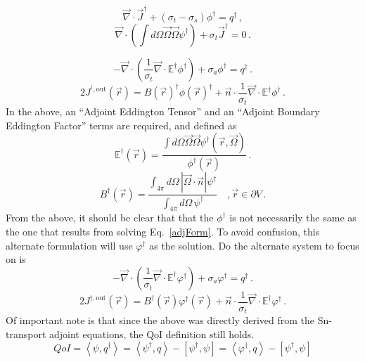 \documentclass[12pt]{report}
\newcommand{\vr}{\vec{r}}
\newcommand{\vO}{\vec{\Omega}}
\newcommand{\bra}{\left\langle}
\newcommand{\ket}{\right\rangle}
\newcommand{\sbra}{\left[}
\newcommand{\sket}{\right]}
\renewcommand{\div}{\vec{\nabla} \cdot}
\newcommand{\bound}{\partial V}
\newcommand{\vn}{\vec{n}}
\newcommand{\Edd}{\mathbb{E}}
\newcommand{\BEdd}{B}
\newcommand{\sigt}{\sigma_t}
\newcommand{\sigs}{\sigma_s}
\newcommand{\siga}{\sigma_a}
\newcommand{\angSource}{q}
\newcommand{\scalSource}{q}
\begin{document}
\begin{equation}
\label{0am}
\div \vec{J}^\dag + (\sigt-\sigs) \phi^\dag  = \scalSource^\dag  \,,
\end{equation}
%
\begin{equation}
\label{1am}
\div \left(  \int d\Omega \vO \vO \psi^\dag  \right) + \sigt \vec{J}^\dag  = 0 \,.
\end{equation}
%

\begin{equation}
\label{TranAdjVEFForm}
- \div \left( \frac{1}{\sigt}\div \Edd^\dag \phi^\dag  \right) + \siga \phi^\dag  = \scalSource^\dag  \,.
\end{equation}
\begin{equation}
2 J^{^\dag,\text{out}}(\vr) = \BEdd(\vr)^\dag \phi(\vr)^\dag  + \vn \cdot \frac{1}{\sigt} \div \Edd^\dag  \phi^\dag  \,.
\end{equation}
In the above, an ``Adjoint Eddington Tensor'' and an ``Adjoint Boundary Eddington Factor'' terms are required, and defined as
\begin{equation}
\label{AdjEddDef}
\Edd^\dag(\vr)=\frac{\int d\Omega \vO \vO \psi^\dag(\vr,\vO)}{\phi^\dag(\vr)} \, .
\end{equation} 
\begin{equation}
\BEdd^\dag(\vr) = \frac{\int_{4 \pi} d\Omega \, | \vO \cdot \vn | \psi^\dag}{\int_{4\pi} d\Omega \, \psi^\dag} \quad , \vr \in \bound \,.
\end{equation}
From the above, it should be clear that that the $\phi^\dag$ is not necessarily the same as the one that results from solving Eq.~\eqref{adjForm}. To avoid confusion, this alternate formulation will use $\varphi^\dag$ as the solution. Do the alternate system to focus on is 
\begin{equation}
\label{TranAdjVEFForm}
- \div \left( \frac{1}{\sigt}\div \Edd^\dag \varphi^\dag  \right) + \siga \varphi^\dag  = \scalSource^\dag  \,.
\end{equation}
\begin{equation}
2 J^{\dag,\text{out}}(\vr) = \BEdd^\dag(\vr) \varphi^\dag(\vr) + \vn \cdot \frac{1}{\sigt} \div \Edd^\dag  \varphi^\dag  \,.
\end{equation}
Of important note is that since the above was directly derived from the Sn-transport adjoint equations, the QoI definition  still holds.
\begin{equation}
\label{AdjQoIAlt}
QoI = \bra \psi , \angSource^\dag \ket = \bra \psi^\dag , \angSource \ket - \sbra \psi^\dag,  \psi \sket = \bra \varphi^\dag , \angSource \ket - \sbra \psi^\dag,  \psi \sket
\end{equation}
\end{document}
